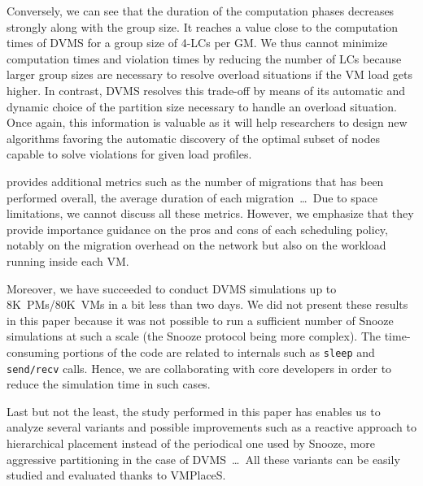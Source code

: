 Conversely, we can see that the duration of the computation phases
decreases strongly along with the group size. It reaches a value close
to the computation times of DVMS for a group size of 4-LCs per
GM.%
We thus cannot minimize computation times and violation times by
reducing the number of LCs because larger group sizes are necessary to
resolve overload situations if the VM load gets higher.  In contrast,
DVMS resolves this trade-off by means of its automatic and dynamic
choice of the partition size necessary to handle an overload
situation.  Once again, this information is valuable as it will help
researchers to design new algorithms favoring the automatic discovery
of the optimal subset of nodes capable to solve violations for given
load profiles.

\vmps provides additional metrics such as the number of migrations
that has been performed overall, the average duration of each
migration~\ldots \ Due to space limitations, we cannot discuss all
these metrics. However, we emphasize that they provide importance
guidance on the pros and cons of each scheduling policy, notably on
the migration overhead on the network but
also on the workload running inside each VM.

Moreover, we have succeeded to conduct DVMS simulations up to
8K~PMs/80K~VMs in a bit less than two days. We did not present these
results in this paper because it was not possible to run a sufficient
number of Snooze simulations at such a scale (the Snooze protocol
being more
complex).
The time-consuming portions of the code are related to \sg internals
such as \texttt{sleep} and \texttt{send/recv} calls. Hence, we are
collaborating with \sg core developers in order to reduce the
simulation time in such cases.

Last but not the least, the study performed in this paper has enables
us to analyze several variants and possible improvements such as a
reactive approach to hierarchical placement instead of the periodical
one used by Snooze, more aggressive partitioning in the case of
DVMS~\ldots \ All these variants can be easily studied and evaluated
thanks to VMPlaceS.




